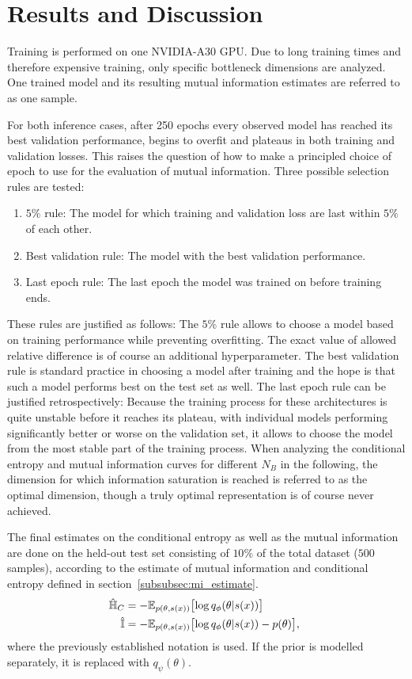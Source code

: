 \section{Results and Discussion}
Training is performed on one NVIDIA-A30 GPU. Due to long training times and therefore expensive training, only specific bottleneck dimensions are analyzed. One trained model and its resulting mutual information estimates are referred to as one sample.

For both inference cases, after 250 epochs every observed model has reached its best validation performance, begins to overfit and plateaus in both training and validation losses. This raises the question of how to make a principled choice of epoch to use for the evaluation of mutual information. Three possible selection rules are tested:
\begin{enumerate}
    \item   $5\%$ rule: The model for which training and validation loss are last within $5\%$ of each other.
    \item   Best validation rule: The model with the best validation performance.
    \item   Last epoch rule: The last epoch the model was trained on before training ends.
\end{enumerate}
These rules are justified as follows: The $5\%$ rule allows to choose a model based on training performance while preventing overfitting. The exact value of allowed relative difference is of course an additional hyperparameter. The best validation rule is standard practice in choosing a model after training and the hope is that such a model performs best on the test set as well. The last epoch rule can be justified retrospectively: Because the training process for these architectures is quite unstable before it reaches its plateau, with individual models performing significantly better or worse on the validation set, it allows to choose the model from the most stable part of the training process. When analyzing the conditional entropy and mutual information curves for different $N_B$ in the following, the dimension for which information saturation is reached is referred to as the optimal dimension, though a truly optimal representation is of course never achieved.

The final estimates on the conditional entropy as well as the mutual information are done on the held-out test set consisting of $10\%$ of the total dataset ($500$ samples), according to the estimate of mutual information and conditional entropy defined in section~\ref{subsubsec:mi_estimate}.
\begin{align}
    \hat{\mathbb{H}}_C &= -\mathbb{E}_{p(\theta,s(x))} \bigl[\log q_\phi (\theta|s(x))\bigr]~\label{eq:final_ce_estimate} \\
    \hat{\mathbb{I}} &= -\mathbb{E}_{p(\theta,s(x))} \bigl[\log q_\phi (\theta|s(x)) - p(\theta)\bigr],~\label{eq:final_mi_estimate}
\end{align}
where the previously established notation is used. If the prior is modelled separately, it is replaced with $q_\psi(\theta)$.

